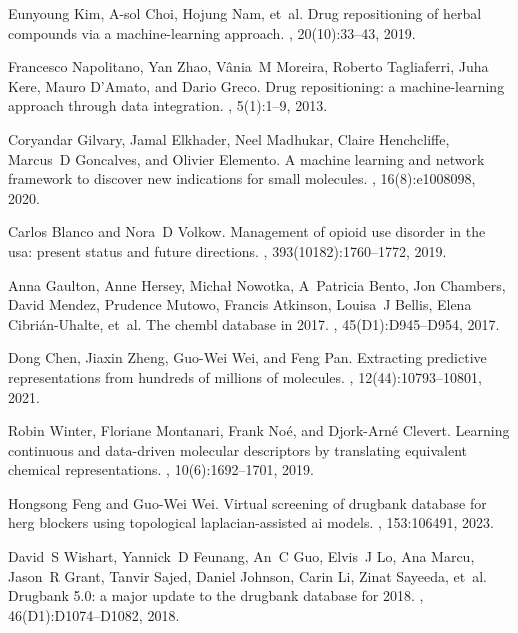 \documentclass[10pt]{article}
\begin{document}
\begin{thebibliography}{10}
			Eunyoung Kim, A-sol Choi, Hojung Nam, et~al.
			\newblock Drug repositioning of herbal compounds via a machine-learning
			approach.
			, 20(10):33--43, 2019.
			
			Francesco Napolitano, Yan Zhao, V{\^a}nia~M Moreira, Roberto Tagliaferri, Juha
			Kere, Mauro D’Amato, and Dario Greco.
			\newblock Drug repositioning: a machine-learning approach through data
			integration.
			, 5(1):1--9, 2013.
			
			Coryandar Gilvary, Jamal Elkhader, Neel Madhukar, Claire Henchcliffe, Marcus~D
			Goncalves, and Olivier Elemento.
			\newblock A machine learning and network framework to discover new indications
			for small molecules.
			, 16(8):e1008098, 2020.
			
			Carlos Blanco and Nora~D Volkow.
			\newblock Management of opioid use disorder in the usa: present status and
			future directions.
			, 393(10182):1760--1772, 2019.
			
			Anna Gaulton, Anne Hersey, Micha{\l} Nowotka, A~Patricia Bento, Jon Chambers,
			David Mendez, Prudence Mutowo, Francis Atkinson, Louisa~J Bellis, Elena
			Cibri{\'a}n-Uhalte, et~al.
			\newblock The chembl database in 2017.
			, 45(D1):D945--D954, 2017.
			
			Dong Chen, Jiaxin Zheng, Guo-Wei Wei, and Feng Pan.
			\newblock Extracting predictive representations from hundreds of millions of
			molecules.
			, 12(44):10793--10801,
			2021.
			
			Robin Winter, Floriane Montanari, Frank No{\'e}, and Djork-Arn{\'e} Clevert.
			\newblock Learning continuous and data-driven molecular descriptors by
			translating equivalent chemical representations.
			, 10(6):1692--1701, 2019.
			
			Hongsong Feng and Guo-Wei Wei.
			\newblock Virtual screening of drugbank database for herg blockers using
			topological laplacian-assisted ai models.
			, 153:106491, 2023.
			
			David~S Wishart, Yannick~D Feunang, An~C Guo, Elvis~J Lo, Ana Marcu, Jason~R
			Grant, Tanvir Sajed, Daniel Johnson, Carin Li, Zinat Sayeeda, et~al.
			\newblock Drugbank 5.0: a major update to the drugbank database for 2018.
			, 46(D1):D1074--D1082, 2018.
			

\end{thebibliography}
\end{document}
